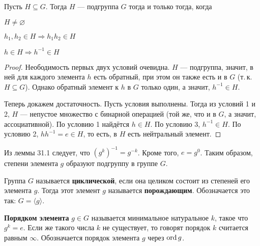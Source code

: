 \begin{theorem}
    Пусть $H \subseteq G$. Тогда $H$ --- подгруппа $G$ тогда и только тогда, когда
    \begin{enumerate}
            \begin{minipage}{.33\textwidth}
            \item $H \ne \varnothing$
            \end{minipage}
            \begin{minipage}{.33\textwidth}
            \item $h_1, h_2 \in H \Rightarrow h_1 h_2 \in H$
            \end{minipage}
            \begin{minipage}{.33\textwidth}
            \item $h \in H \Rightarrow h^{-1} \in H$
            \end{minipage}
    \end{enumerate}
\end{theorem}

\begin{proof}
    Неободимость первых двух условий очевидна. $H$ --- подгруппа, значит, в ней для каждого элемента $h$ есть обратный, при этом он также есть и в $G$ (т.\,к. $H \subseteq G$). Однако обратный элемент к $h$ в $G$ только один, а значит, $h^{-1} \in H$.

    Теперь докажем достаточность. Пусть условия выполнены. Тогда из условий 1 и 2, $H$ --- непустое множество с бинарной операцией (той же, что и в $G$, а значит, ассоциативной). По условию 1 найдётся $h \in H$. По условию 3, $h^{-1} \in H$. По условию 2, $hh^{-1} = e \in H$, то есть, в $H$ есть нейтральный элемент.
\end{proof}

\begin{remark}
    Из леммы 31.1 следует, что $(g^k)^{-1} = g^{-k}$. Кроме того, $e = g^0$. Таким образом, степени элемента $g$ образуют подгруппу в группе $G$.
\end{remark}

\begin{definition}
    Группа $G$ называется \textbf{циклической}, если она целиком состоит из степеней его элемента $g$. Тогда этот элемент $g$ называется \textbf{порождающим}. Обозначается это так: $G = \langle g\rangle$.
\end{definition}

\begin{definition}
    \textbf{Порядком элемента} $g \in G$ называется минимальное натуральное $k$, такое что $g^k = e$. Если же такого числа $k$ не существует, то говорят порядок $k$ считается равным $\infty$. Обозначается порядок элемента $g$ через $\mathrm{ord}\, g$.
\end{definition}

